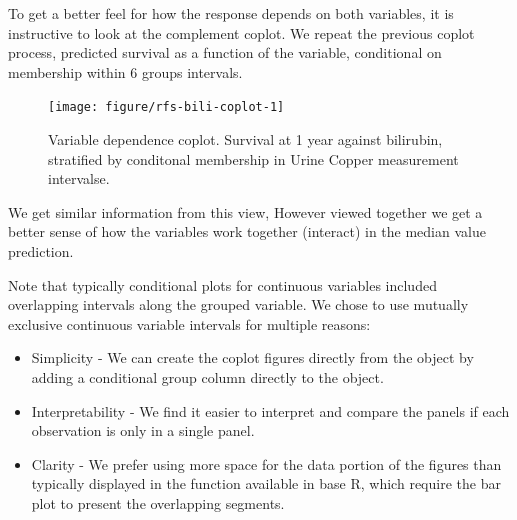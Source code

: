 \documentclass[nojss]{jss}\usepackage[]{graphicx}\usepackage[]{color}
\begin{document}
To get a better feel for how the response depends on both variables, it is instructive to look at the complement coplot. We repeat the previous coplot process, predicted survival as a function of the  variable, conditional on membership within 6 groups  intervals. 


\begin{Schunk}
\begin{figure}[!htpb]

{\centering \texttt{[image: figure/rfs-bili-coplot-1]} 

}

\caption[Variable dependence coplot]{Variable dependence coplot. Survival at 1 year against bilirubin, stratified by conditonal membership in Urine Copper measurement intervalse.\label{fig:bili-coplot}}
\end{figure}
\end{Schunk}


We get similar information from this view,  However viewed together we get a better sense of how the  variables work together (interact) in the median value prediction.

Note that typically \cite{cleveland:1993} conditional plots for continuous variables included overlapping intervals along the grouped variable. We chose to use mutually exclusive continuous variable intervals for multiple reasons:
 \begin{itemize}
 \item Simplicity - We can create the coplot figures directly from the  object by adding a conditional group column directly to the object.

 \item Interpretability - We find it easier to interpret and compare the panels if each observation is only in a single panel.

 \item Clarity - We prefer using more space for the data portion of the figures than typically displayed in the  function available in base R, which require the bar plot to present the overlapping segments.
 \end{itemize}
 
\end{document}
